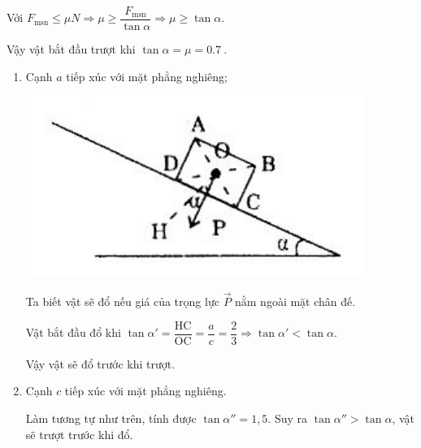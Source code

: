 \begin{enumerate}[label=\bfseries Câu \arabic*:]
{	Với $F_\text{msn} \leq \mu N \Rightarrow \mu \geq \dfrac{F_\text{msn}}{\tan \alpha} \Rightarrow \mu \geq \tan \alpha$.
	
	Vậy vật bắt đầu trượt khi $\tan \alpha = \mu = \SI{0.7}{}$.
			\begin{enumerate}
			\item Cạnh $a$ tiếp xúc với mặt phẳng nghiêng;
			
	\begin{center}
		\includegraphics[scale=1]{../figs/VN10-2021-PH-TP023-4.png}
	\end{center}

	Ta biết vật sẽ đổ nếu giá của trọng lực $\vec P$ nằm ngoài mặt chân đế.
	
	Vật bắt đầu đổ khi $\tan \alpha' = \dfrac{\text{HC}}{\text{OC}} = \dfrac{a}{c} = \dfrac{2}{3} \Rightarrow \tan \alpha' < \tan \alpha$.
	
	Vậy vật sẽ đổ trước khi trượt.	
			\item Cạnh $c$ tiếp xúc với mặt phẳng nghiêng.
			
	Làm tương tự như trên, tính được $\tan \alpha'' = 1,5$. Suy ra $\tan \alpha'' > \tan \alpha$, vật sẽ trượt trước khi đổ.
		\end{enumerate}
	}
\end{enumerate}